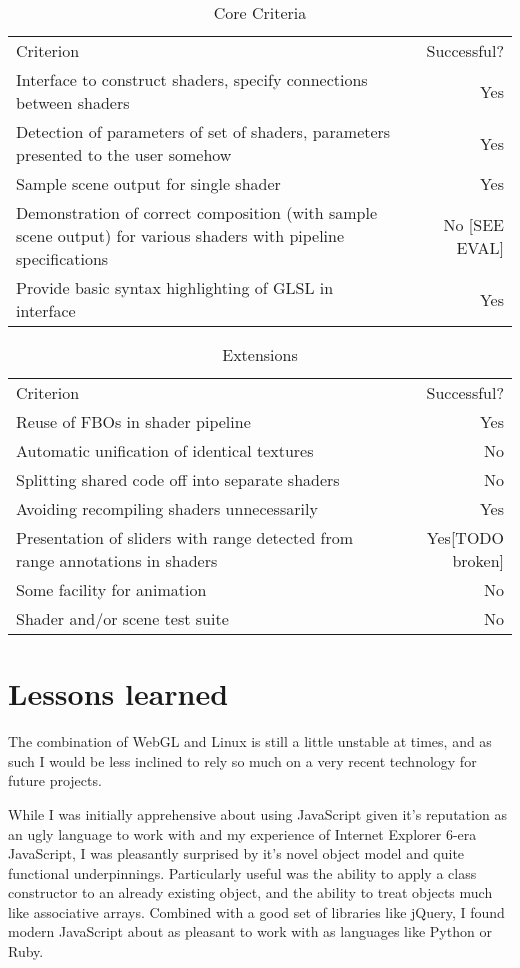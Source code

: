 \documentclass[12pt,twoside,notitlepage]{report}
\begin{document}
\begin{table}
\begin{tabular}{p{9cm} | r}
Criterion & Successful? \\
Interface to construct shaders, specify connections between shaders & Yes \\
Detection of parameters of set of shaders, parameters presented to the user somehow & Yes \\
Sample scene output for single shader & Yes \\
Demonstration of correct composition (with sample scene output) for various shaders with pipeline specifications & No [SEE EVAL]\\
Provide basic syntax highlighting of GLSL in interface & Yes \\
\end{tabular}
\label{core_t}
\caption{Core Criteria}
\end{table}
\begin{table}
\begin{tabular}{p{9cm} | r}
Criterion & Successful? \\
Reuse of FBOs in shader pipeline & Yes \\
Automatic unification of identical textures & No \footnotemark[1] \\
Splitting shared code off into separate shaders & No \footnotemark[2] \\
Avoiding recompiling shaders unnecessarily & Yes \\
Presentation of sliders with range detected from range annotations in shaders & Yes[TODO broken]\\
Some facility for animation & No \\
Shader and/or scene test suite & No \\
\end{tabular}
\label{ext_t}
\caption{Extensions}
\end{table}
\section{Lessons learned}
The combination of WebGL and Linux is still a little unstable at times, and as such I would be less inclined to rely so much on a very recent technology for future projects.

While I was initially apprehensive about using JavaScript given it's reputation as an ugly language to work with and my experience of Internet Explorer 6-era JavaScript, I was pleasantly surprised by it's novel object model and quite functional underpinnings. Particularly useful was the ability to apply a class constructor to an already existing object, and the ability to treat objects much like associative arrays. Combined with a good set of libraries like jQuery, I found modern JavaScript about as pleasant to work with as languages like Python or Ruby.
\end{document}
